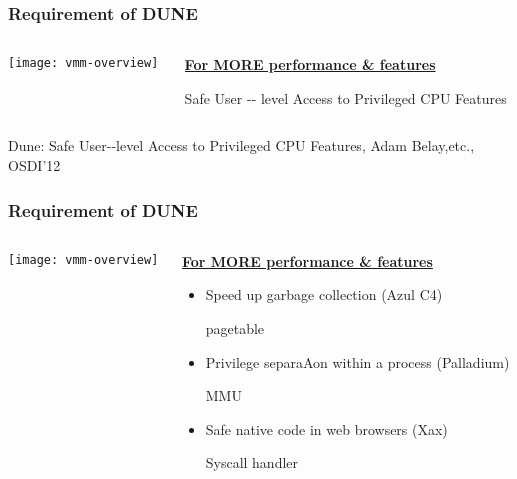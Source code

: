 \begin{frame}[plain]
	\frametitle{Requirement of DUNE}
	
	
	
	\begin{columns}
		
		\begin{column}{.4\textwidth}
			
			\texttt{[image: vmm-overview]}
			
		\end{column}
		
		\begin{column}{.7\textwidth}
			
			\LARGE
			\underline{\textbf{For MORE performance \& features}}
			
			\large
			Safe	
 User -‐ level	
 Access	
 to Privileged	
 CPU	
 Features			
			
		\end{column}
		
		
	\end{columns}
	\tiny Dune:	
 Safe	
 User-­‐level	
 Access
 to 	Privileged	
 CPU	
 Features, Adam 
 Belay,etc.,	OSDI'12

\end{frame}


\begin{frame}[plain]
	\frametitle{Requirement of DUNE}
	
	
	
	\begin{columns}
		
		\begin{column}{.4\textwidth}
			
			\texttt{[image: vmm-overview]}
			
		\end{column}
		
		\begin{column}{.6\textwidth}
			
			\Large
			\underline{\textbf{For MORE performance \& features}}
		\small	
		\begin{itemize}
	\item Speed	 up	 garbage	 collection	 (Azul	 C4)	
	
	pagetable
    \item Privilege separaAon	 within	 a	 process	 (Palladium)
    
    MMU	
	\item Safe	 native code	 in	 web	 browsers	 (Xax) 
	
	Syscall handler
	
\end{itemize}		
			
		\end{column}
		
		
	\end{columns}

	
\end{frame}



